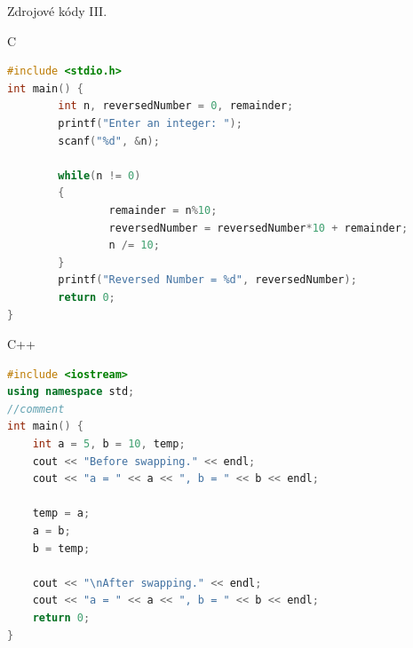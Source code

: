 \documentclass{beamer}							%
\begin{document}
\begin{frame}[fragile, shrink=20]{Zdrojové kódy III.}


	C
	\begin{lstlisting}[language=C]
#include <stdio.h>
int main() {
		int n, reversedNumber = 0, remainder;
		printf("Enter an integer: ");
		scanf("%d", &n);

		while(n != 0)
		{
				remainder = n%10;
				reversedNumber = reversedNumber*10 + remainder;
				n /= 10;
		}
		printf("Reversed Number = %d", reversedNumber);
		return 0;
}
\end{lstlisting}

C++
\begin{lstlisting}[language=C++]
#include <iostream>
using namespace std;
//comment 
int main() {
	int a = 5, b = 10, temp;
	cout << "Before swapping." << endl;
	cout << "a = " << a << ", b = " << b << endl;

	temp = a;
	a = b;
	b = temp;

	cout << "\nAfter swapping." << endl;
	cout << "a = " << a << ", b = " << b << endl;
	return 0;
}
\end{lstlisting}
\end{frame}
\end{document}
